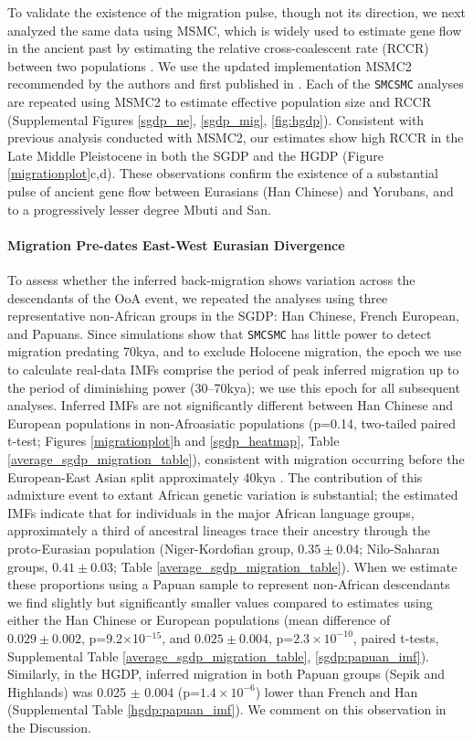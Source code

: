 \documentclass{article}
\begin{document}
To validate the existence of the migration pulse, though not its direction, we next analyzed the same data using MSMC, which is widely used to estimate gene flow in the ancient past by estimating the relative cross-coalescent rate (RCCR) between two populations \cite{Schiffels2014a,Fan2019, Pagani2015, Raghavan2015}. We use the updated implementation MSMC2 recommended by the authors and first published in \cite{Malaspinas2016}. Each of the {\tt SMCSMC} analyses are repeated using MSMC2 to estimate effective population size and RCCR (Supplemental Figures \ref{sgdp_ne}, \ref{sgdp_mig}, \ref{fig:hgdp}). Consistent with previous analysis conducted with MSMC2, our estimates show high RCCR in the Late Middle Pleistocene in both the SGDP and the HGDP (Figure \ref{migrationplot}c,d). These observations confirm the existence of a substantial pulse of ancient gene flow between Eurasians (Han Chinese) and Yorubans, and to a progressively lesser degree Mbuti and San.

\paragraph{Migration Pre-dates East-West Eurasian Divergence}

To assess whether the inferred back-migration shows variation across the descendants of the OoA event, we repeated the analyses using three representative non-African groups in the SGDP: Han Chinese, French European, and Papuans.  Since simulations show that {\tt SMCSMC} has little power to detect migration predating 70kya, and to exclude Holocene migration, the epoch we use to calculate real-data IMFs comprise the period of peak inferred migration up to the period of diminishing power (30--70kya); we use this epoch for all subsequent analyses. Inferred IMFs are not significantly different between Han Chinese and European populations in non-Afroasiatic populations (p=0.14, two-tailed paired t-test; Figures \ref{migrationplot}h and \ref{sgdp_heatmap}, Table \ref{average_sgdp_migration_table}), consistent with migration occurring before the European-East Asian split approximately 40kya \cite{Mathieson2014}.  The contribution of this admixture event to extant African genetic variation is substantial; the estimated IMFs indicate that for individuals in the major African language groups, approximately a third of ancestral lineages trace their ancestry through the proto-Eurasian population (Niger-Kordofian group, $0.35\pm 0.04$; Nilo-Saharan groups, $0.41\pm 0.03$; Table \ref{average_sgdp_migration_table}). When we estimate these proportions using a Papuan sample to represent non-African descendants we find slightly but significantly smaller values compared to estimates using either the Han Chinese or European populations (mean difference of $0.029 \pm 0.002$, p=9.2$\times$10$^{-15}$, and $0.025 \pm 0.004$, p=$2.3\times 10^{-10}$, paired t-tests, Supplemental Table \ref{average_sgdp_migration_table}, \ref{sgdp:papuan_imf}). Similarly, in the HGDP, inferred migration in both Papuan groups (Sepik and Highlands) was 0.025 $\pm$ 0.004 (p=$1.4\times10^{-6}$) lower than French and Han (Supplemental Table \ref{hgdp:papuan_imf}).  We comment on this observation in the Discussion. 
\end{document}
